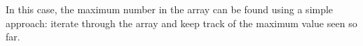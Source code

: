 \documentclass[preview]{standalone}
\begin{document}
In this case, the maximum number in the array can be found using a simple approach: iterate through the array and keep track of the maximum value seen so far.\\
\end{document}
